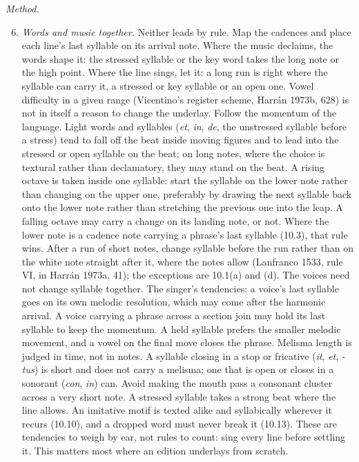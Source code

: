 \textit{Method.}

\begin{enumerate}

\setcounter{enumi}{5}
\tightlist
\item
  \textit{Words and music together.} Neither leads by rule. Map the cadences and place each line's last syllable on its arrival note. Where the music declaims, the words shape it: the stressed syllable or the key word takes the long note or the high point. Where the line sings, let it: a long run is right where the syllable can carry it, a stressed or key syllable or an open one. Vowel difficulty in a given range (Vicentino's register scheme, Harrán 1973b, 628) is not in itself a reason to change the underlay. Follow the momentum of the language. Light words and syllables (\emph{et}, \emph{in}, \emph{de}, the unstressed syllable before a stress) tend to fall off the beat inside moving figures and to lead into the stressed or open syllable on the beat; on long notes, where the choice is textural rather than declamatory, they may stand on the beat. A rising octave is taken inside one syllable: start the syllable on the lower note rather than changing on the upper one, preferably by drawing the next syllable back onto the lower note rather than stretching the previous one into the leap. A falling octave may carry a change on its landing note, or not. Where the lower note is a cadence note carrying a phrase's last syllable (10.3), that rule wins. After a run of short notes, change syllable before the run rather than on the white note straight after it, where the notes allow (Lanfranco 1533, rule VI, in Harrán 1973a, 41); the exceptions are 10.1(a) and (d). The voices need not change syllable together. The singer's tendencies: a voice's last syllable goes on its own melodic resolution, which may come after the harmonic arrival. A voice carrying a phrase across a section join may hold its last syllable to keep the momentum. A held syllable prefers the smaller melodic movement, and a vowel on the final move closes the phrase. Melisma length is judged in time, not in notes. A syllable closing in a stop or fricative (\emph{it}, \emph{et}, \emph{-tus}) is short and does not carry a melisma; one that is open or closes in a sonorant (\emph{con}, \emph{in}) can. Avoid making the mouth pass a consonant cluster across a very short note. A stressed syllable takes a strong beat where the line allows. An imitative motif is texted alike and syllabically wherever it recurs (10.10), and a dropped word must never break it (10.13). These are tendencies to weigh by ear, not rules to count: sing every line before settling it. This matters most where an edition underlays from scratch.

\end{enumerate}
